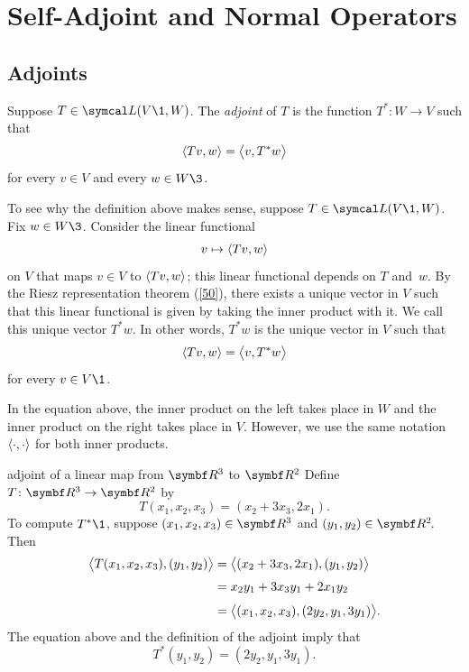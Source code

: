 
\section{Self-Adjoint and Normal Operators} \label{selfadjoint_normal}  %

\subsection{Adjoints}

{Suppose $T \in \L(V\1, W)$. The \emph{adjoint} of $T$ is the function $T^* \colon W \to V$ such that
\[
\ip{Tv, w} = \ip[\big]{v, T^*w}
\]
for every $v \in V$ and every $w \in W\3$.}


To see why the definition above makes sense, suppose $T \in \L(V\1, W)$. Fix $w \in W\3$. Consider  the linear functional
\[
v \mapsto \ip{Tv,w}
\]
on $V$ that maps $v \in V$ to $\ip{Tv, w}$; this linear functional depends on $T$ and~$w$. By the Riesz representation theorem (\ref{50}), there exists a unique vector in $V$ such that this linear functional is given by taking the inner product with it. We call this unique vector $T^*w$. In other words, $T^*w$ is the unique vector in $V$ such that
\[
\ip{Tv, w} = \ip[\big]{v, T^*w}
\]
for every $v \in V\1$.

In the equation above, the inner product on the left takes place in $W$ and the inner product on the right takes place in $V$. However, we use the same notation $\ip{\cdot, \cdot}$ for both inner products.

\begin{example}{adjoint of a linear map from\/ $\R3$ to\/ $\R2$}
Define $T \colon \R{3} \rightarrow \R{2}$ by
\[
T(x_1, x_2, x_3) = (x_2 + 3x_3, 2x_1).
\]
To compute $T^*\1$, suppose $(x_1, x_2, x_3) \in \R3$ and {$(y_1, y_2) \in \RR{2}$}.  Then
\begin{align*}
\ip[\big]{T(x_1, x_2, x_3), (y_1, y_2)} &= \ip[\big]{ (x_2 + 3x_3, 2x_1), (y_1, y_2)} \\[3bp]
&= x_2 y_1 + 3x_3 y_1 + 2 x_1 y_2 \\[3bp]
&= \ip[\big]{(x_1, x_2, x_3), (2y_2, y_1, 3y_1)}.
\end{align*}
The equation above and the definition of the adjoint imply that
\[
T^*(y_1, y_2) = (2y_2, y_1, 3y_1).
\]
\exercisedisplayend
\end{example}

